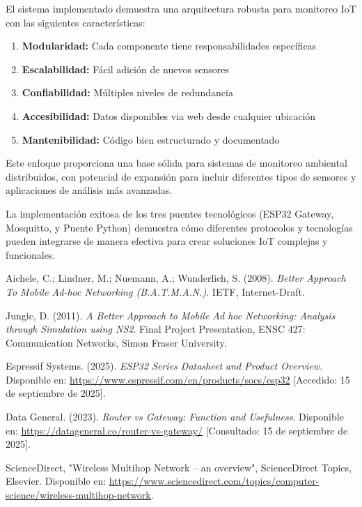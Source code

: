 \documentclass[12pt]{article}
\begin{document}
El sistema implementado demuestra una arquitectura robusta para monitoreo IoT con las siguientes características:

\begin{enumerate}
    \item \textbf{Modularidad:} Cada componente tiene responsabilidades específicas
    \item \textbf{Escalabilidad:} Fácil adición de nuevos sensores
    \item \textbf{Confiabilidad:} Múltiples niveles de redundancia
    \item \textbf{Accesibilidad:} Datos disponibles via web desde cualquier ubicación
    \item \textbf{Mantenibilidad:} Código bien estructurado y documentado
\end{enumerate}

Este enfoque proporciona una base sólida para sistemas de monitoreo ambiental distribuidos, con potencial de expansión para incluir diferentes tipos de sensores y aplicaciones de análisis más avanzadas.

La implementación exitosa de los tres puentes tecnológicos (ESP32 Gateway, Mosquitto, y Puente Python) demuestra cómo diferentes protocolos y tecnologías pueden integrarse de manera efectiva para crear soluciones IoT complejas y funcionales.

\begin{thebibliography}{10}

Aichele, C.; Lindner, M.; Nuemann, A.; Wunderlich, S. (2008). 
\textit{Better Approach To Mobile Ad-hoc Networking (B.A.T.M.A.N.)}. 
IETF, Internet-Draft.

Jungic, D. (2011). 
\textit{A Better Approach to Mobile Ad hoc Networking: Analysis through Simulation using NS2}. 
Final Project Presentation, ENSC 427: Communication Networks, Simon Fraser University.

Espressif Systems. (2025). 
\textit{ESP32 Series Datasheet and Product Overview}. 
Disponible en: \url{https://www.espressif.com/en/products/socs/esp32} [Accedido: 15 de septiembre de 2025].

Data General. (2023). \textit{Router vs Gateway: Function and Usefulness}. Disponible en: \url{https://datageneral.co/router-vs-gateway/} [Consultado: 15 de septiembre de 2025].

ScienceDirect, "Wireless Multihop Network – an overview", ScienceDirect Topics, Elsevier. Disponible en: \url{https://www.sciencedirect.com/topics/computer-science/wireless-multihop-network}.

\end{thebibliography}
\end{document}
